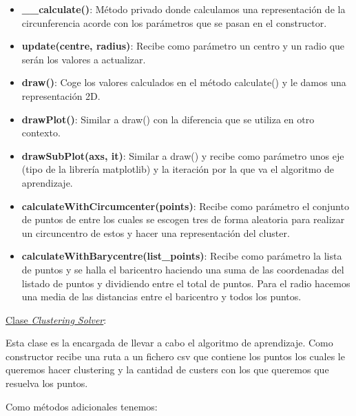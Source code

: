 \documentclass[conference,a4paper]{IEEEtran}
\begin{document}
\begin{itemize}

	\item{\textbf{\_\_calculate()}: Método privado donde calculamos una representación de la circunferencia acorde con los parámetros que se pasan en el constructor.}
	\item{\textbf{update(centre, radius)}: Recibe como parámetro un centro y un radio que serán los valores a actualizar.}
	\item{\textbf{draw()}: Coge los valores calculados en el método calculate() y le damos una representación 2D. }
	\item{\textbf{drawPlot()}: Similar a draw() con la diferencia que se utiliza en otro contexto.}
	\item{\textbf{drawSubPlot(axs, it)}: Similar a draw() y recibe como parámetro unos eje (tipo de la librería matplotlib) y la iteración por la que va el algoritmo de aprendizaje.}
	\item{\textbf{calculateWithCircumcenter(points)}: Recibe como parámetro el conjunto de puntos de entre los cuales se escogen tres de forma aleatoria para realizar un circuncentro de estos y hacer una representación del cluster.}
	\item{\textbf{calculateWithBarycentre(list\_points)}: Recibe como parámetro la lista de puntos y se halla el baricentro haciendo una suma de las coordenadas del listado de puntos y dividiendo entre el total de puntos.  Para el radio hacemos una media de las distancias entre el baricentro y todos los puntos.}

\end{itemize}

\underline{Clase \textit{Clustering Solver}}:

Esta clase es la encargada de llevar a cabo el algoritmo de aprendizaje. Como constructor recibe una ruta a un fichero csv que contiene los puntos los cuales le queremos hacer clustering y la cantidad de custers con los que queremos que resuelva los puntos.

Como métodos adicionales tenemos:
\end{document}
